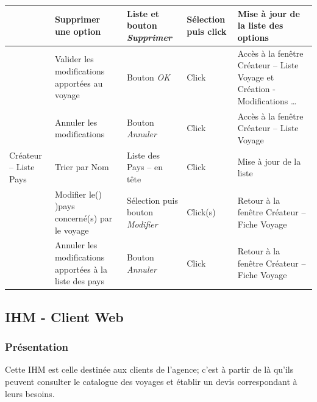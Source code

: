 \documentclass[12pt]{article}
\begin{document}
\begin{center}
\begin{footnotesize}
\begin{supertabular}{|p{2cm}|p{3cm}|p{3.5cm}|p{2cm}|p{4cm}|}
 & Supprimer une option & Liste et bouton \emph{Supprimer} & Sélection puis click & Mise à jour de la  liste des options \\ \hline
 & Valider les modifications apportées au voyage & Bouton \emph{OK} & Click & Accès à la fenêtre Créateur – Liste Voyage et Création - Modifications \ldots \\ \hline
 & Annuler les modifications & Bouton \emph{Annuler} & Click & Accès à la fenêtre Créateur – Liste Voyage \\ \hline
Créateur – Liste Pays & Trier par Nom & Liste des Pays – en tête & Click & Mise à jour de la liste \\ \hline
 & Modifier le() )pays concerné(s) par le voyage & Sélection puis bouton \emph{Modifier} & Click(s) & Retour à la fenêtre Créateur – Fiche Voyage \\ \hline
 & Annuler les modifications apportées à la liste des pays & Bouton \emph{Annuler} & Click & Retour à la fenêtre Créateur – Fiche Voyage \\ 
 \hline
\end{supertabular}
\end{footnotesize}
\end{center}

\subsection{IHM - Client Web}
\subsubsection{Présentation}
Cette IHM est celle destinée aux clients de l'agence; c'est à partir de là qu'ils peuvent consulter le catalogue des voyages et établir un devis correspondant à leurs besoins.
\end{document}
